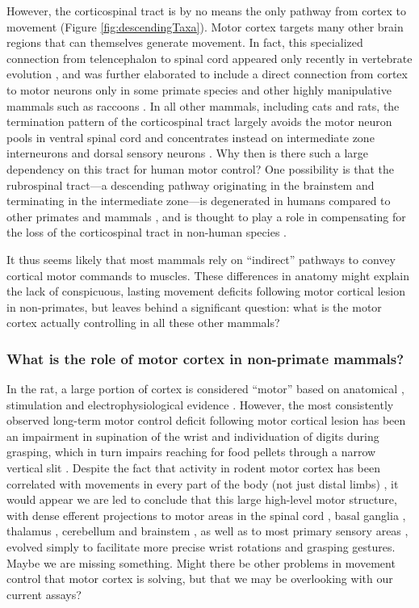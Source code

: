 However, the corticospinal tract is by no means the only pathway from cortex to movement (Figure \ref{fig:descendingTaxa}). Motor cortex targets many other brain regions that can themselves generate movement. In fact, this specialized connection from telencephalon to spinal cord appeared only recently in vertebrate evolution \cite{TenDonkelaar2009}, and was further elaborated to include a direct connection from cortex to motor neurons only in some primate species and other highly manipulative mammals such as raccoons \cite{Heffner1983}. In all other mammals, including cats and rats, the termination pattern of the corticospinal tract largely avoids the motor neuron pools in ventral spinal cord and concentrates instead on intermediate zone interneurons and dorsal sensory neurons \cite{Kuypers1981,Yang2003}. Why then is there such a large dependency on this tract for human motor control? One possibility is that the rubrospinal tract---a descending pathway originating in the brainstem and terminating in the intermediate zone---is degenerated in humans compared to other primates and mammals \cite{Nathan1955,Nathan1982}, and is thought to play a role in compensating for the loss of the corticospinal tract in non-human species \cite{Lawrence1968a,Zaaimi2012}.

It thus seems likely that most mammals rely on ``indirect'' pathways to convey cortical motor commands to muscles. These differences in anatomy might explain the lack of conspicuous, lasting movement deficits following motor cortical lesion in non-primates, but leaves behind a significant question: what is the motor cortex actually controlling in all these other mammals?

\subsubsection*{What is the role of motor cortex in non-primate mammals?}

In the rat, a large portion of cortex is considered ``motor'' based on anatomical \cite{Donoghue1982}, stimulation \cite{Donoghue1982,Neafsey1986} and electrophysiological evidence \cite{Hyland1998}. However, the most consistently observed long-term motor control deficit following motor cortical lesion has been an impairment in supination of the wrist and individuation of digits during grasping, which in turn impairs reaching for food pellets through a narrow vertical slit \cite{Whishaw1991,Alaverdashvili2008a}. Despite the fact that activity in rodent motor cortex has been correlated with movements in every part of the body (not just distal limbs) \cite{Hill2011,Erlich2011}, it would appear we are led to conclude that this large high-level motor structure, with dense efferent projections to motor areas in the spinal cord \cite{Kuypers1981}, basal ganglia \cite{Turner2000,Wu2009}, thalamus \cite{Lee2008}, cerebellum \cite{Baker2001} and brainstem \cite{Jarratt1999}, as well as to most primary sensory areas \cite{Petreanu2012,Schneider2014}, evolved simply to facilitate more precise wrist rotations and grasping gestures. Maybe we are missing something. Might there be other problems in movement control that motor cortex is solving, but that we may be overlooking with our current assays?


